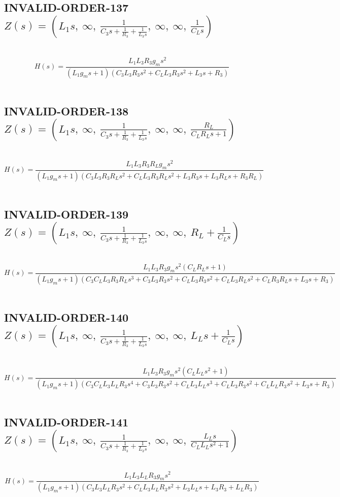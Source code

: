 \documentclass{article}
\begin{document}
\subsection{INVALID-ORDER-137 $Z(s) = \left( L_{1} s, \  \infty, \  \frac{1}{C_{3} s + \frac{1}{R_{3}} + \frac{1}{L_{3} s}}, \  \infty, \  \infty, \  \frac{1}{C_{L} s}\right)$ } \ 
\textbf{\[H(s) = \frac{L_{1} L_{3} R_{3} g_{m} s^{2}}{\left(L_{1} g_{m} s + 1\right) \left(C_{3} L_{3} R_{3} s^{2} + C_{L} L_{3} R_{3} s^{2} + L_{3} s + R_{3}\right)}\] } \ 
\subsection{INVALID-ORDER-138 $Z(s) = \left( L_{1} s, \  \infty, \  \frac{1}{C_{3} s + \frac{1}{R_{3}} + \frac{1}{L_{3} s}}, \  \infty, \  \infty, \  \frac{R_{L}}{C_{L} R_{L} s + 1}\right)$ } \ 
\textbf{\[H(s) = \frac{L_{1} L_{3} R_{3} R_{L} g_{m} s^{2}}{\left(L_{1} g_{m} s + 1\right) \left(C_{3} L_{3} R_{3} R_{L} s^{2} + C_{L} L_{3} R_{3} R_{L} s^{2} + L_{3} R_{3} s + L_{3} R_{L} s + R_{3} R_{L}\right)}\] } \ 
\subsection{INVALID-ORDER-139 $Z(s) = \left( L_{1} s, \  \infty, \  \frac{1}{C_{3} s + \frac{1}{R_{3}} + \frac{1}{L_{3} s}}, \  \infty, \  \infty, \  R_{L} + \frac{1}{C_{L} s}\right)$ } \ 
\textbf{\[H(s) = \frac{L_{1} L_{3} R_{3} g_{m} s^{2} \left(C_{L} R_{L} s + 1\right)}{\left(L_{1} g_{m} s + 1\right) \left(C_{3} C_{L} L_{3} R_{3} R_{L} s^{3} + C_{3} L_{3} R_{3} s^{2} + C_{L} L_{3} R_{3} s^{2} + C_{L} L_{3} R_{L} s^{2} + C_{L} R_{3} R_{L} s + L_{3} s + R_{3}\right)}\] } \ 
\subsection{INVALID-ORDER-140 $Z(s) = \left( L_{1} s, \  \infty, \  \frac{1}{C_{3} s + \frac{1}{R_{3}} + \frac{1}{L_{3} s}}, \  \infty, \  \infty, \  L_{L} s + \frac{1}{C_{L} s}\right)$ } \ 
\textbf{\[H(s) = \frac{L_{1} L_{3} R_{3} g_{m} s^{2} \left(C_{L} L_{L} s^{2} + 1\right)}{\left(L_{1} g_{m} s + 1\right) \left(C_{3} C_{L} L_{3} L_{L} R_{3} s^{4} + C_{3} L_{3} R_{3} s^{2} + C_{L} L_{3} L_{L} s^{3} + C_{L} L_{3} R_{3} s^{2} + C_{L} L_{L} R_{3} s^{2} + L_{3} s + R_{3}\right)}\] } \ 
\subsection{INVALID-ORDER-141 $Z(s) = \left( L_{1} s, \  \infty, \  \frac{1}{C_{3} s + \frac{1}{R_{3}} + \frac{1}{L_{3} s}}, \  \infty, \  \infty, \  \frac{L_{L} s}{C_{L} L_{L} s^{2} + 1}\right)$ } \ 
\textbf{\[H(s) = \frac{L_{1} L_{3} L_{L} R_{3} g_{m} s^{2}}{\left(L_{1} g_{m} s + 1\right) \left(C_{3} L_{3} L_{L} R_{3} s^{2} + C_{L} L_{3} L_{L} R_{3} s^{2} + L_{3} L_{L} s + L_{3} R_{3} + L_{L} R_{3}\right)}\] } \ 
\end{document}
